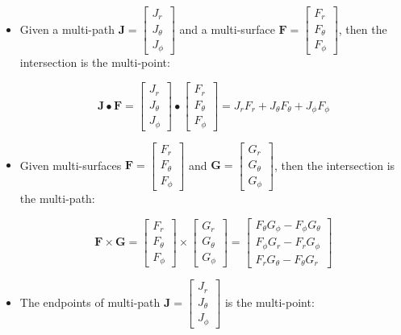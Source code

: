 \begin{itemize}
\item Given a multi-path \(\mathbf{J} = \begin{bmatrix} J_r \\ J_\theta \\ J_\phi \end{bmatrix}\) and a multi-surface \(\mathbf{F} = \begin{bmatrix} F_r \\ F_\theta \\ F_\phi \end{bmatrix}\), then the intersection is the multi-point:

\[\mathbf{J} \bullet \mathbf{F} = \begin{bmatrix} J_r \\ J_\theta \\ J_\phi \end{bmatrix} \bullet \begin{bmatrix} F_r \\ F_\theta \\ F_\phi \end{bmatrix} = J_r F_r + J_\theta F_\theta + J_\phi F_\phi\]
\item Given multi-surfaces \(\mathbf{F} = \begin{bmatrix} F_r \\ F_\theta \\ F_\phi \end{bmatrix}\) and \(\mathbf{G} = \begin{bmatrix} G_r \\ G_\theta \\ G_\phi \end{bmatrix}\), then the intersection is the multi-path:

\[\mathbf{F} \times \mathbf{G} = \begin{bmatrix} F_r \\ F_\theta \\ F_\phi \end{bmatrix} \times \begin{bmatrix} G_r \\ G_\theta \\ G_\phi \end{bmatrix}
 = \begin{bmatrix} F_\theta G_\phi - F_\phi G_\theta \\ F_\phi G_r - F_r G_\phi \\ F_r G_\theta - F_\theta G_r \end{bmatrix}\]
\item The endpoints of multi-path \(\mathbf{J} = \begin{bmatrix} J_r \\ J_\theta \\ J_\phi \end{bmatrix}\) is the multi-point:


\end{itemize}
